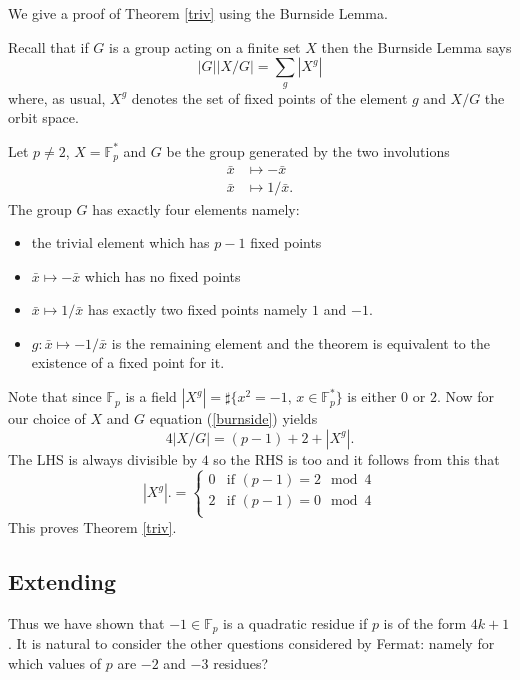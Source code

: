\documentclass[12pt,a4paper]{amsart}
\def\fp{\mathbb{F}_p}
\begin{document}
We give a proof of Theorem \ref{triv} using the Burnside Lemma.


Recall that if $G$ is  a group acting on a finite set $X$ then the Burnside Lemma says
\begin{equation}\label{burnside}
|G| |X/G| = \sum_{g} |X^g| 
\end{equation}  
where, as usual, 
 $X^g$ denotes the set of fixed points of the element $g$ 
 and $X/G$  the orbit space.

Let $p\neq 2$,  $X = \fp^*$ and $G$ be the group generated by the two involutions
\begin{eqnarray*}
	\bar{x} & \mapsto -\bar{x} \\
	\bar{x} & \mapsto 1/\bar{x}.
\end{eqnarray*}
The group  $G$ has exactly four elements namely:
\begin{itemize}
\item the trivial element which has  $p-1$ fixed points
\item $\bar{x} \mapsto -\bar{x}$ which has no fixed points 
\item  $\bar{x}\mapsto 1/\bar{x}$ has exactly two fixed points namely $1$ and $-1$.
\item  $g:\bar{x} \mapsto -1/ \bar{x}$ is the remaining element and the theorem is equivalent to the existence of a fixed point for it.
\end{itemize}
Note that since $\fp$ is a field 
$|X^g| = \sharp \{x^2 = -1, \, x\in \fp^* \}$
is either $0$ or $2$.
Now for our choice of $X$ and $G$ equation (\ref{burnside}) yields
\begin{equation}
4 |X/G|   = (p-1) + 2 + |X^g|.
\end{equation}  
The LHS is always divisible by $4$ so the  RHS is too and
it follows from this that
$$ |X^g|. = \left\{  \begin{array}{ll}
		0 & \text{if }(p-1) =  2 \mod 4 \\
2 & \text{if }(p-1) =  0 \mod 4 \\
\end{array}
\right.
$$
This proves Theorem \ref{triv}.

\subsection{Extending}\label{extending}

Thus we have shown that $-1 \in \fp$ is a quadratic residue 
if $p$ is of the form $4k+1$. 
It is natural to consider the other questions considered by Fermat:
namely for which values of $p$ are $-2$ and $-3$ residues?
\end{document}
